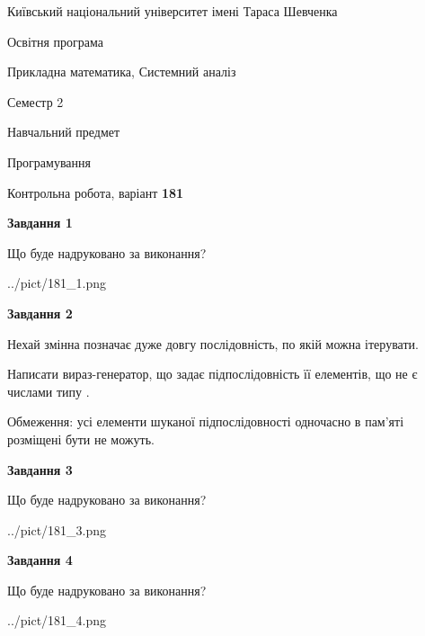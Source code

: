 \documentclass[12pt, ukrainian]{article}
\begin{document}
{{\begin {small}\par
{ \center  Київський національний університет імені Тараса Шевченка \par}
{\parbox {5 cm}{Освітня програма \hfill}{\parbox {8 cm}{Прикладна математика, Системний аналіз \hfill}}\parbox {5 cm}{\hfill Семестр 2}}\par
{\parbox {5 cm} {Навчальний предмет \hfill}\parbox {7 cm}{Програмування \hfill}\parbox {6cm}{\hfill}\par}\vspace{-7pt} \end{small}}{\center Контрольна робота, варіант  \No \textbf
{ 181 }\par}}
{
\begin {large}
{\begin {center}\textbf{Завдання 1}\end {center}}\par
Що буде надруковано за виконання?\par\par
\begin{center}
	{../pict/181_1.png}
\end{center}
\newpage

{\begin {center}\textbf{Завдання 2}\end {center}}\par
Нехай змінна  позначає дуже довгу послідовність, по якій можна ітерувати.

Написати вираз-генератор, що задає підпослідовність її елементів, що не є числами типу .

Обмеження: усі елементи шуканої підпослідовності одночасно в пам'яті розміщені бути не можуть.\par
\newpage

{\begin {center}\textbf{Завдання 3}\end {center}}\par
Що буде надруковано за виконання?\par
\begin{center}
	{../pict/181_3.png}
\end{center}
\newpage

{\begin {center}\textbf{Завдання 4}\end {center}}\par
Що буде надруковано за виконання?\par
\begin{center}
	{../pict/181_4.png}
\end{center}
\newpage


\end{large}}
\end{document}
